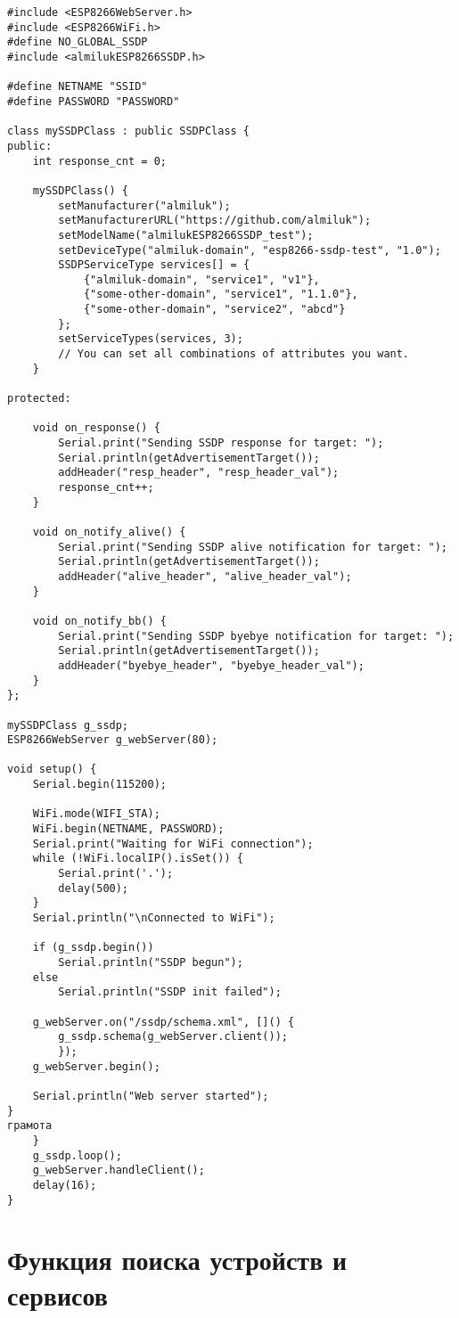 \begin{verbatim}
#include <ESP8266WebServer.h>
#include <ESP8266WiFi.h>
#define NO_GLOBAL_SSDP
#include <almilukESP8266SSDP.h>

#define NETNAME "SSID"
#define PASSWORD "PASSWORD"

class mySSDPClass : public SSDPClass {
public:
	int response_cnt = 0;

	mySSDPClass() {
		setManufacturer("almiluk");
		setManufacturerURL("https://github.com/almiluk");
		setModelName("almilukESP8266SSDP_test");
		setDeviceType("almiluk-domain", "esp8266-ssdp-test", "1.0");
		SSDPServiceType services[] = {
			{"almiluk-domain", "service1", "v1"},
			{"some-other-domain", "service1", "1.1.0"},
			{"some-other-domain", "service2", "abcd"}
		};
		setServiceTypes(services, 3);
		// You can set all combinations of attributes you want.
	}

protected:

	void on_response() {
		Serial.print("Sending SSDP response for target: ");
		Serial.println(getAdvertisementTarget());
		addHeader("resp_header", "resp_header_val");
		response_cnt++;
	}

	void on_notify_alive() {
		Serial.print("Sending SSDP alive notification for target: ");
		Serial.println(getAdvertisementTarget());
		addHeader("alive_header", "alive_header_val");
	}

	void on_notify_bb() {
		Serial.print("Sending SSDP byebye notification for target: ");
		Serial.println(getAdvertisementTarget());
		addHeader("byebye_header", "byebye_header_val");
	}
};

mySSDPClass g_ssdp;
ESP8266WebServer g_webServer(80);

void setup() {
	Serial.begin(115200);

	WiFi.mode(WIFI_STA);
	WiFi.begin(NETNAME, PASSWORD);
	Serial.print("Waiting for WiFi connection");
	while (!WiFi.localIP().isSet()) {
		Serial.print('.');
		delay(500);
	}
	Serial.println("\nConnected to WiFi");

	if (g_ssdp.begin())
		Serial.println("SSDP begun");
	else
		Serial.println("SSDP init failed");

	g_webServer.on("/ssdp/schema.xml", []() {
		g_ssdp.schema(g_webServer.client());
		});
	g_webServer.begin();

	Serial.println("Web server started");
}
грамота
	}
	g_ssdp.loop();
	g_webServer.handleClient();
	delay(16);
}
\end{verbatim}


\chapter{Функция поиска устройств и сервисов} \label{appendix:search-func}

